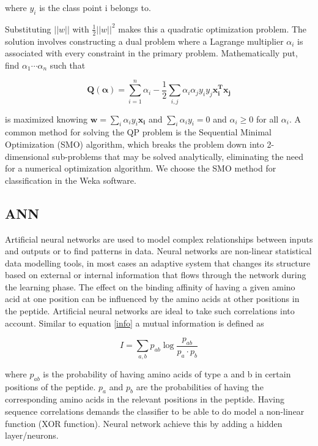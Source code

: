 where $y_i$ is the class point i belongs to.

Substituting $||w||$ with $\frac{1}{2}||w||^2$ makes this a quadratic optimization problem. 
The solution involves constructing a dual problem where 
a Lagrange multiplier $\alpha_i$ 
is associated with every 
constraint in the primary problem. Mathematically put, find $\alpha_1 \cdots \alpha_n$
such that

\begin{equation}
\mathbf{Q(\alpha)} = \sum_{i=1}^{n}{\alpha_i} - \frac{1}{2}\sum_{i,j}{\alpha_i\alpha_j y_i y_j \mathbf{x_i^T x_j} }
\end{equation}

is maximized knowing $\mathbf{w} = \sum_{i}{ \alpha_i y_i \mathbf{x_i} }$ and $\sum_{i}{\alpha_i y_i} = 0$ and $\alpha_i \geq 0$ for all $\alpha_i$.  
A common method for solving the QP problem is the Sequential Minimal Optimization (SMO) algorithm, 
which breaks the problem down into 2-dimensional sub-problems that may be solved analytically, eliminating the need for a numerical optimization algorithm.
We choose the SMO method for classification in the Weka software.

\subsection*{ANN}
Artificial neural networks are used to model complex relationships between inputs and outputs or to find patterns in data.
Neural networks are non-linear statistical data modelling tools, in most cases an adaptive system that changes its structure based on external or internal information that flows through the network during the learning phase.
The effect on the binding affinity of
having a given amino acid at one
position can be influenced by the
amino acids at other positions in the
peptide. Artificial neural networks are
ideal to take such
correlations into account. Similar to equation \ref{info} a mutual information is defined as

\begin{equation}
\label{mutinfo}
I = \sum_{a,b}{ p_{ab}\log{ \frac{ p_{ab} }{ p_a \cdot p_b } } }
\end{equation}

where $p_{ab}$ is the probability of having amino acids of type a and b in certain positions of the peptide. $p_a$ and $p_b$ are the probabilities of having the corresponding amino acids in the relevant positions in the peptide.
Having sequence correlations demands the classifier to be able to do model a non-linear function (XOR function). Neural network achieve this by adding a hidden layer/neurons.

